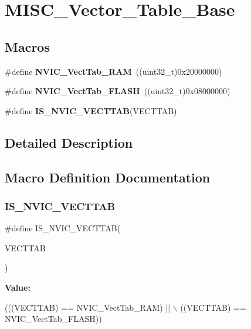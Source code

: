 \hypertarget{group___m_i_s_c___vector___table___base}{}\section{M\+I\+S\+C\+\_\+\+Vector\+\_\+\+Table\+\_\+\+Base}
\label{group___m_i_s_c___vector___table___base}
\subsection*{Macros}
\begin{DoxyCompactItemize}
\item 
\mbox{\label{group___m_i_s_c___vector___table___base_ga8be8181cc3e5d42f6204af306ab50f80}} 
\#define {\bfseries N\+V\+I\+C\+\_\+\+Vect\+Tab\+\_\+\+R\+AM}~((uint32\+\_\+t)0x20000000)
\item 
\mbox{\label{group___m_i_s_c___vector___table___base_gafbf92fd28a1090b2aa49732ebd5704b5}} 
\#define {\bfseries N\+V\+I\+C\+\_\+\+Vect\+Tab\+\_\+\+F\+L\+A\+SH}~((uint32\+\_\+t)0x08000000)
\item 
\#define {\bfseries I\+S\+\_\+\+N\+V\+I\+C\+\_\+\+V\+E\+C\+T\+T\+AB}(V\+E\+C\+T\+T\+AB)
\end{DoxyCompactItemize}


\subsection{Detailed Description}


\subsection{Macro Definition Documentation}
\mbox{\label{group___m_i_s_c___vector___table___base_ga26b9d493ccb98fcce9a27303078940c8}} 
\subsubsection{\texorpdfstring{I\+S\+\_\+\+N\+V\+I\+C\+\_\+\+V\+E\+C\+T\+T\+AB}{IS\_NVIC\_VECTTAB}}
{\footnotesize\ttfamily \#define I\+S\+\_\+\+N\+V\+I\+C\+\_\+\+V\+E\+C\+T\+T\+AB(\begin{DoxyParamCaption}\item[{}]{V\+E\+C\+T\+T\+AB }\end{DoxyParamCaption})}

{\bfseries Value\+:}
\begin{DoxyCode}
(((VECTTAB) == NVIC\_VectTab\_RAM) || \(\backslash\)
                                  ((VECTTAB) == NVIC\_VectTab\_FLASH))
\end{DoxyCode}
